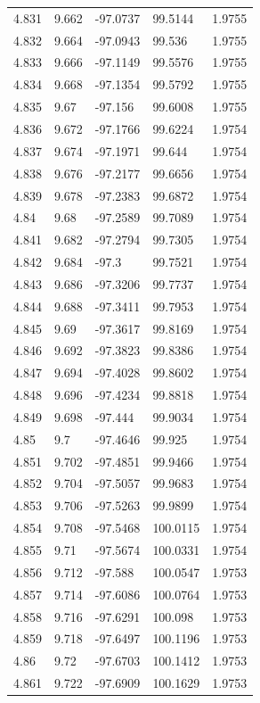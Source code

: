 \begin{tabular}{lllll}
4.831 & 9.662 & -97.0737 & 99.5144 & 1.9755 \\
4.832 & 9.664 & -97.0943 & 99.536 & 1.9755 \\
4.833 & 9.666 & -97.1149 & 99.5576 & 1.9755 \\
4.834 & 9.668 & -97.1354 & 99.5792 & 1.9755 \\
4.835 & 9.67 & -97.156 & 99.6008 & 1.9755 \\
4.836 & 9.672 & -97.1766 & 99.6224 & 1.9754 \\
4.837 & 9.674 & -97.1971 & 99.644 & 1.9754 \\
4.838 & 9.676 & -97.2177 & 99.6656 & 1.9754 \\
4.839 & 9.678 & -97.2383 & 99.6872 & 1.9754 \\
4.84 & 9.68 & -97.2589 & 99.7089 & 1.9754 \\
4.841 & 9.682 & -97.2794 & 99.7305 & 1.9754 \\
4.842 & 9.684 & -97.3 & 99.7521 & 1.9754 \\
4.843 & 9.686 & -97.3206 & 99.7737 & 1.9754 \\
4.844 & 9.688 & -97.3411 & 99.7953 & 1.9754 \\
4.845 & 9.69 & -97.3617 & 99.8169 & 1.9754 \\
4.846 & 9.692 & -97.3823 & 99.8386 & 1.9754 \\
4.847 & 9.694 & -97.4028 & 99.8602 & 1.9754 \\
4.848 & 9.696 & -97.4234 & 99.8818 & 1.9754 \\
4.849 & 9.698 & -97.444 & 99.9034 & 1.9754 \\
4.85 & 9.7 & -97.4646 & 99.925 & 1.9754 \\
4.851 & 9.702 & -97.4851 & 99.9466 & 1.9754 \\
4.852 & 9.704 & -97.5057 & 99.9683 & 1.9754 \\
4.853 & 9.706 & -97.5263 & 99.9899 & 1.9754 \\
4.854 & 9.708 & -97.5468 & 100.0115 & 1.9754 \\
4.855 & 9.71 & -97.5674 & 100.0331 & 1.9754 \\
4.856 & 9.712 & -97.588 & 100.0547 & 1.9753 \\
4.857 & 9.714 & -97.6086 & 100.0764 & 1.9753 \\
4.858 & 9.716 & -97.6291 & 100.098 & 1.9753 \\
4.859 & 9.718 & -97.6497 & 100.1196 & 1.9753 \\
4.86 & 9.72 & -97.6703 & 100.1412 & 1.9753 \\
4.861 & 9.722 & -97.6909 & 100.1629 & 1.9753 \\

\end{tabular}
